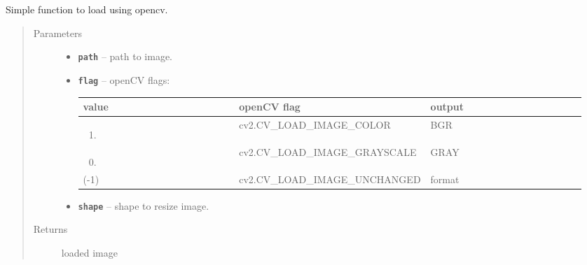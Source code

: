 \documentclass[letterpaper,10pt,english]{sphinxmanual}
\begin{document}
\begin{fulllineitems}
\label{RRtoolbox.lib:RRtoolbox.lib.image.loadcv}
Simple function to load using opencv.
\begin{quote}\begin{description}
\item[{Parameters}] \leavevmode\begin{itemize}
\item {} 
\textbf{\texttt{path}} -- path to image.

\item {} 
\textbf{\texttt{flag}} -- 
openCV flags:

\begin{tabular}{|p{0.317\linewidth}|p{0.317\linewidth}|p{0.317\linewidth}|}
\hline
\textsf{\relax 
value
} & \textsf{\relax 
openCV flag
} & \textsf{\relax 
output
}\\
\hline\begin{enumerate}
\item {} 
\end{enumerate}
 & 
cv2.CV\_LOAD\_IMAGE\_COLOR
 & 
BGR
\\
\hline\begin{enumerate}
\setcounter{enumi}{-1}
\item {} 
\end{enumerate}
 & 
cv2.CV\_LOAD\_IMAGE\_GRAYSCALE
 & 
GRAY
\\
\hline
(-1)
 & 
cv2.CV\_LOAD\_IMAGE\_UNCHANGED
 & 
format
\\
\hline\end{tabular}



\item {} 
\textbf{\texttt{shape}} -- shape to resize image.

\end{itemize}

\item[{Returns}] \leavevmode
loaded image

\end{description}\end{quote}

\end{fulllineitems}

\end{document}
